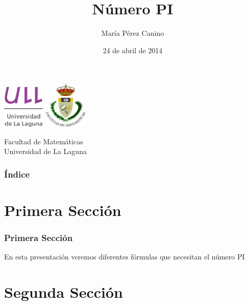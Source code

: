 \documentclass{beamer}
\title[Presentación con Beamer]{Número PI}
\author[Técnicas Experimentales]{María Pérez Canino}
\date[24-04-2014]{24 de abril de 2014}
\begin{document}
\begin{frame}

  \includegraphics[width=0.15\textwidth]{img/ullesc.eps}
  \hspace*{7.5cm}
  \includegraphics[width=0.16\textwidth]{img/fmatesc.eps}
  \titlepage

  \begin{scriptsize}
    \begin{center}
     Facultad de Matemáticas \\
     Universidad de La Laguna
    \end{center}
  \end{scriptsize}

\end{frame} 


\begin{frame}
  \frametitle{Índice}  
  \tableofcontents[pausesections]
\end{frame}  


\section{Primera Sección}

\begin{frame}

\frametitle{Primera Sección}

En esta presentación veremos diferentes fórmulas que necesitan el número PI

\end{frame}

\section{Segunda Sección}
\end{document}
